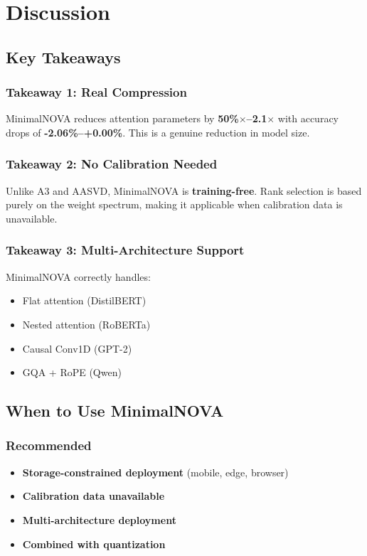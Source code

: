 
\section{Discussion}

\subsection{Key Takeaways}

\subsubsection{Takeaway 1: Real Compression}

MinimalNOVA reduces attention parameters by \textbf{50\%$\times$--2.1$\times$} 
with accuracy drops of \textbf{-2.06\%--+0.00\%}. This is a genuine 
reduction in model size.

\subsubsection{Takeaway 2: No Calibration Needed}

Unlike A3 and AASVD, MinimalNOVA is \textbf{training-free}. Rank selection is 
based purely on the weight spectrum, making it applicable when calibration 
data is unavailable.

\subsubsection{Takeaway 3: Multi-Architecture Support}

MinimalNOVA correctly handles:
\begin{itemize}
\item Flat attention (DistilBERT)
\item Nested attention (RoBERTa)
\item Causal Conv1D (GPT-2)
\item GQA + RoPE (Qwen)

\end{itemize}
\subsection{When to Use MinimalNOVA}

\subsubsection{Recommended}

\begin{itemize}
\item \textbf{Storage-constrained deployment} (mobile, edge, browser)
\item \textbf{Calibration data unavailable}
\item \textbf{Multi-architecture deployment}
\item \textbf{Combined with quantization}

\end{itemize}
